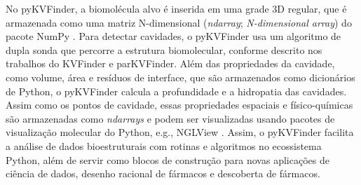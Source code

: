 \documentclass[Portugues]{phdquali}
\newcommand{\link}[1]{{\color{blue}\href{#1}{#1}}}
\def\eg{e.g.\onedot}
\begin{document}
No pyKVFinder, a biomolécula alvo é inserida em uma grade 3D regular, que é armazenada como uma matriz N-dimensional (\textit{ndarray}; \textit{N-dimensional array}) do pacote NumPy \cite{numpy}. Para detectar cavidades, o pyKVFinder usa um algoritmo de dupla sonda que percorre a estrutura biomolecular, conforme descrito nos trabalhos do KVFinder e parKVFinder. Além das propriedades da cavidade, como volume, área e resíduos de interface, que são armazenados como dicionários de Python, o pyKVFinder calcula a profundidade e a hidropatia das cavidades. Assim como os pontos de cavidade, essas propriedades espaciais e físico-químicas são armazenadas como \textit{ndarrays} e podem ser visualizadas usando pacotes de visualização molecular do Python, \eg, NGLView \cite{nglview}. Assim, o pyKVFinder facilita a análise de dados bioestruturais com rotinas e algoritmos no ecossistema Python, além de servir como blocos de construção para novas aplicações de ciência de dados, desenho racional de fármacos e descoberta de fármacos. 



\end{document}
